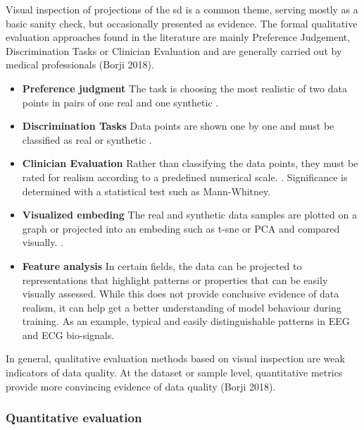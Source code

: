             Visual inspection of projections of the \gls{sd} is a common theme, serving mostly as a basic sanity check, but occasionally presented as evidence. The formal qualitative evaluation approaches found in the literature are mainly Preference Judgement, Discrimination Tasks or Clinician Evaluation and are generally carried out by medical professionals (Borji 2018).
                \begin{itemize}
                    \item \textbf{Preference judgment} The task is choosing the most realistic of two data points in pairs of one real and one synthetic \cite{Choi2017-nt}.
                    \item \textbf{Discrimination Tasks} Data points are shown one by one and must be classified as real or synthetic \cite{Beaulieu-Jones2019-ct}.
                    \item \textbf{Clinician Evaluation} Rather than classifying the data points, they must be rated for realism according to a predefined numerical scale. \cite{Beaulieu-Jones2019-ct}. Significance is determined with a statistical test such as Mann-Whitney.
                    \item \textbf{Visualized embeding} The real and synthetic data samples are plotted on a graph or projected into an embeding such as \gls{t-sne} or PCA and compared visually. \cite{cui2019conan, yu2019rare, zhu_2020, yale2019ESANN, Yang_2019_ehr,Beaulieu-Jones2019-ct, tanti2019, dash2019synthetic}.
                    \item \textbf{Feature analysis} In certain fields, the data can be projected to representations that highlight patterns or properties that can be easily visually assessed. While this does not provide conclusive evidence of data realism, it can help get a better understanding of model behaviour during training. As an example, typical and easily distinguishable patterns in EEG and ECG bio-signals. \cite{Harada2019}
                \end{itemize}
    
        In general, qualitative evaluation methods based on visual inspection are weak indicators of data quality. At the dataset or sample level, quantitative metrics provide more convincing evidence of data quality (Borji 2018).
        
        \subsubsection{Quantitative evaluation}
        
